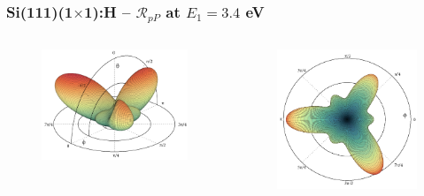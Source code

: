 \documentclass{beamer}
\begin{document}
\begin{frame}
\frametitle{Si(111)(1\texorpdfstring{$\times$}{x}1):H -- 
\texorpdfstring{$\mathcal{R}_{pP}$}{RpP} at
\texorpdfstring{$E_{1} = 3.4$}{E1 = 3.4} eV}
\begin{columns}
\begin{figure}
\centering
\includegraphics[height=0.6\textheight]{3Dside01}
\end{figure}
\begin{figure}
\centering
\includegraphics[height=0.6\textheight]{3Dtop}
\end{figure}
\end{columns}
\end{frame}
\end{document}
